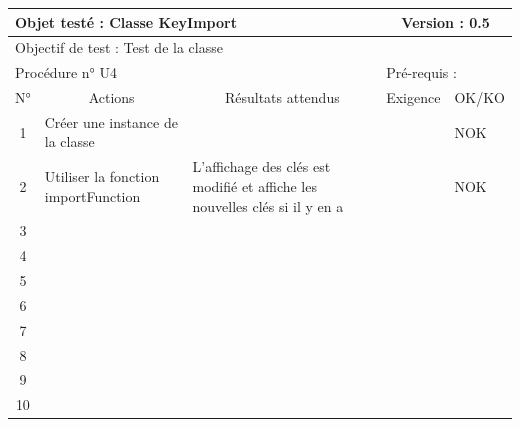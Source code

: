\documentclass{../res/univ-projet}
\begin{document}
\begin{center}
    \begin{tabular}{|c|p{5cm}|p{5cm}|p{1.5cm}|p{1.5cm}|}
      \hline
      \multicolumn{3}{|l|}{Objet testé : Classe KeyImport} & \multicolumn{2}{c|}{Version : 0.5}\\ \hline
      \multicolumn{5}{|l|}{Objectif de test : Test de la classe}\\ \hline
      \multicolumn{3}{|l|}{Procédure n° U4} & \multicolumn{2}{p{3cm}|}{Pré-requis : }\\ \hline
      \multicolumn{1}{|c|}{N°} & \multicolumn{1}{c|}{Actions} & \multicolumn{1}{c|}{Résultats attendus} & 
      \multicolumn{1}{c|}{Exigence} & \multicolumn{1}{c|}{OK/KO}\\ \hline
      1 & Créer une instance de la classe &  &  & NOK \\
      2 & Utiliser la fonction importFunction & L'affichage des clés est modifié et affiche les nouvelles clés si il y en a &  & NOK \\
      3 &  &  &  & \\
      4 &  &  &  & \\
      5 &  &  &  & \\
	    6 &  &  &  & \\
      7 &  &  &  & \\
      8 &  &  &  & \\
      9 &  &  &  & \\
      10 &  &  &  &\\ 
	\hline
    \end{tabular}
    \vskip 2.2cm
    

\end{center}
\end{document}
